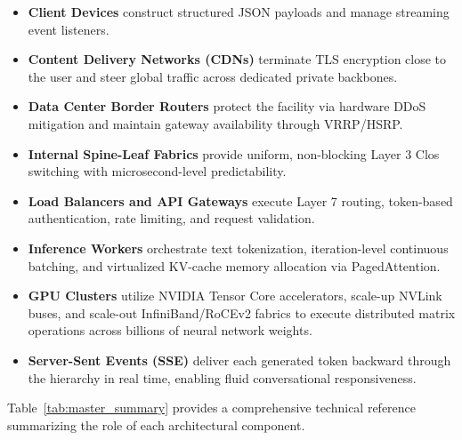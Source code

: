 \documentclass[12pt,a4paper]{report}
\begin{document}
\begin{itemize}[leftmargin=1.2cm]
    \item \textbf{Client Devices} construct structured JSON payloads and manage streaming event listeners.
    \item \textbf{Content Delivery Networks (CDNs)} terminate TLS encryption close to the user and steer global traffic across dedicated private backbones.
    \item \textbf{Data Center Border Routers} protect the facility via hardware DDoS mitigation and maintain gateway availability through VRRP/HSRP.
    \item \textbf{Internal Spine-Leaf Fabrics} provide uniform, non-blocking Layer 3 Clos switching with microsecond-level predictability.
    \item \textbf{Load Balancers and API Gateways} execute Layer 7 routing, token-based authentication, rate limiting, and request validation.
    \item \textbf{Inference Workers} orchestrate text tokenization, iteration-level continuous batching, and virtualized KV-cache memory allocation via PagedAttention.
    \item \textbf{GPU Clusters} utilize NVIDIA Tensor Core accelerators, scale-up NVLink buses, and scale-out InfiniBand/RoCEv2 fabrics to execute distributed matrix operations across billions of neural network weights.
    \item \textbf{Server-Sent Events (SSE)} deliver each generated token backward through the hierarchy in real time, enabling fluid conversational responsiveness.
\end{itemize}

Table~\ref{tab:master_summary} provides a comprehensive technical reference summarizing the role of each architectural component.
\end{document}
